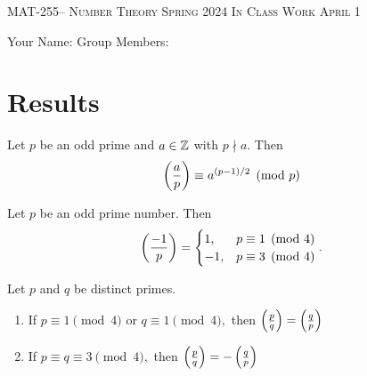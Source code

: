 \documentclass[handout]{ximera}
\date{April 1, 2024}
\begin{document}
\handoutAbstract
\maketitle
 	\begin{center}%
    	{\large \scshape MAT-255-- Number Theory 
			\hfill Spring 2024 
			\hfill In Class Work April 1}%
    
		{\large Your Name: \hrulefill \quad 
			Group Members:\hrulefill \quad 
			\hrulefill
			\par}%
 	\end{center}%
	 
\section*{Results}
\begin{theorem}\label{thm:euler-quads}
	Let $p$ be an odd prime and $a\in\mathbb Z$ with $p\nmid a.$ Then \[\left(\frac{a}{p}\right)\equiv a^{(p-1)/2}\pmod{p}\]
\end{theorem}


\begin{theorem}[Theorem 4.6]\label{thm:residue-neg1}
	Let $p$ be an odd prime number. Then 
	\[
		\left(\frac{-1}{p}\right)=
			\begin{cases}
 				1, & p\equiv 1\pmod{4}\\
				-1, & p\equiv 3\pmod{4}
			\end{cases}.
	\]
\end{theorem}

\begin{theorem}\label{quad-rec}
	Let $p$ and $q$ be distinct primes.  
	\begin{enumerate}[label=(\alph*)]
		\item If $p\equiv 1 \pmod{4}$ or $q\equiv 1\pmod{4},$ then $\left(\frac{p}{q}\right)=\left(\frac{q}{p}\right)$
 		\item If $p\equiv q \equiv 3 \pmod{4},$ then $\left(\frac{p}{q}\right)=-\left(\frac{q}{p}\right)$
	\end{enumerate}
\end{theorem}
\end{document}
